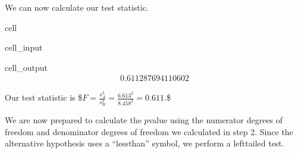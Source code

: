 \documentclass[letterpaper,10pt,english]{jupyterBook}
\begin{document}
\sphinxAtStartPar
We can now calculate our test statistic.

\begin{sphinxuseclass}{cell}\begin{sphinxVerbatimInput}

\begin{sphinxuseclass}{cell_input}
\begin{sphinxVerbatim}[commandchars=\\\{\}]
\end{sphinxVerbatim}

\end{sphinxuseclass}\end{sphinxVerbatimInput}
\begin{sphinxVerbatimOutput}

\begin{sphinxuseclass}{cell_output}\begin{equation*}
\begin{split}0.611287694110602\end{split}
\end{equation*}
\end{sphinxuseclass}\end{sphinxVerbatimOutput}

\end{sphinxuseclass}
\sphinxAtStartPar
Our test statistic is
\$\( F = \frac{s_A^2}{s_B^2} = \frac{6.613^2}{8.458^2} = 0.611. \)\$

\sphinxAtStartPar
We are now prepared to calculate the \(p\)\sphinxhyphen{}value using the numerator degrees of freedom and denominator degrees of freedom we calculated in step 2. Since the alternative hypothesis uses a “less\sphinxhyphen{}than” symbol, we perform a left\sphinxhyphen{}tailed test.
\end{document}
